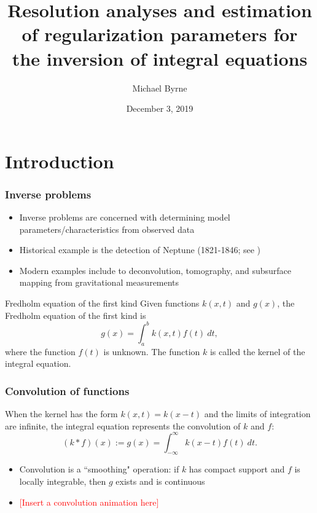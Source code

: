 \documentclass{beamer}
\author{Michael Byrne}
\title{Resolution analyses and estimation of regularization parameters for the inversion of integral equations}
\institute{Arizona State University}
\date{December 3, 2019}
\newcommand{\ToDo}[1]{\textcolor{red}{[#1]}}
\begin{document}
\begin{frame}
\titlepage
\end{frame}

\begin{frame}
\tableofcontents
\end{frame}

\section{Introduction}

\begin{frame}
\frametitle{Inverse problems}
\begin{itemize}
\item Inverse problems are concerned with determining model parameters/characteristics from observed data
\item Historical example is the detection of Neptune (1821-1846; see \cite{Airy1847})
\item Modern examples include to deconvolution, tomography, and subsurface mapping from gravitational measurements
\end{itemize}
\begin{block}{Fredholm equation of the first kind}
Given functions $k(x,t)$ and $g(x)$, the Fredholm equation of the first kind is
\[g(x) = \int_a^b k(x,t)f(t)~dt,\]
where the function $f(t)$ is unknown. The function $k$ is called the kernel of the integral equation.
\end{block}
\end{frame}

\begin{frame}
\frametitle{Convolution of functions}
When the kernel has the form $k(x,t) = k(x-t)$ and the limits of integration are infinite, the integral equation represents the convolution of $k$ and $f$:
\[(k * f)(x) := g(x) = \int_{-\infty}^{\infty} k(x-t)f(t)~dt.\]
\begin{itemize}
\item Convolution is a ``smoothing" operation: if $k$ has compact support and $f$ is locally integrable, then $g$ exists and is continuous \cite{DebnathLokenath1999ItHs}
\item \ToDo{Insert a convolution animation here}
\end{itemize}
\end{frame}
\end{document}
